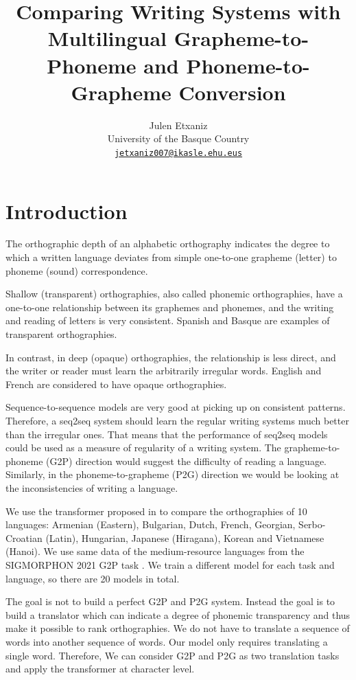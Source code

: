 \documentclass[11pt,a4paper]{article}
\title{Comparing Writing Systems with Multilingual Grapheme-to-Phoneme and Phoneme-to-Grapheme Conversion}
\author{Julen Etxaniz \\
  University of the Basque Country\\
  \texttt{\href{mailto:jetxaniz007@ikasle.ehu.eus}{jetxaniz007@ikasle.ehu.eus}}}
\date{}
\begin{document}
\maketitle
\begin{abstract}

\end{abstract}

\section{Introduction}

The orthographic depth of an alphabetic orthography indicates the degree to which a written language deviates from simple one-to-one grapheme (letter) to phoneme (sound) correspondence. 

Shallow (transparent) orthographies, also called phonemic orthographies, have a one-to-one relationship between its graphemes and phonemes, and the writing and reading of letters is very consistent. Spanish and Basque are examples of transparent orthographies.

In contrast, in deep (opaque) orthographies, the relationship is less direct, and the writer or reader must learn the arbitrarily irregular words. English and French are considered to have opaque orthographies.

Sequence-to-sequence models are very good at picking up on consistent patterns. Therefore, a seq2seq system should learn the regular writing systems much better than the irregular ones. That means that the performance of seq2seq models could be used as a measure of regularity of a writing system. The grapheme-to-phoneme (G2P) direction would suggest the difficulty of reading a language. Similarly, in the phoneme-to-grapheme (P2G) direction we would be looking at the inconsistencies of writing a language.

We use the transformer proposed in \citet{wu2021applying} to compare the orthographies of 10 languages: Armenian (Eastern), Bulgarian, Dutch, French, Georgian, Serbo-Croatian (Latin), Hungarian, Japanese (Hiragana), Korean and Vietnamese (Hanoi). We use same data of the medium-resource languages from the SIGMORPHON 2021 G2P task \cite{ashby-etal-2021-results}. We train a different model for each task and language, so there are 20 models in total.

The goal is not to build a perfect G2P and P2G system. Instead the goal is to build a translator which can indicate a degree of phonemic transparency and thus make it possible to rank orthographies. We do not have to translate a
sequence of words into another sequence of words. Our model only requires translating a single word. Therefore, We can consider G2P and P2G as two translation tasks and apply the transformer at character level.
\end{document}
